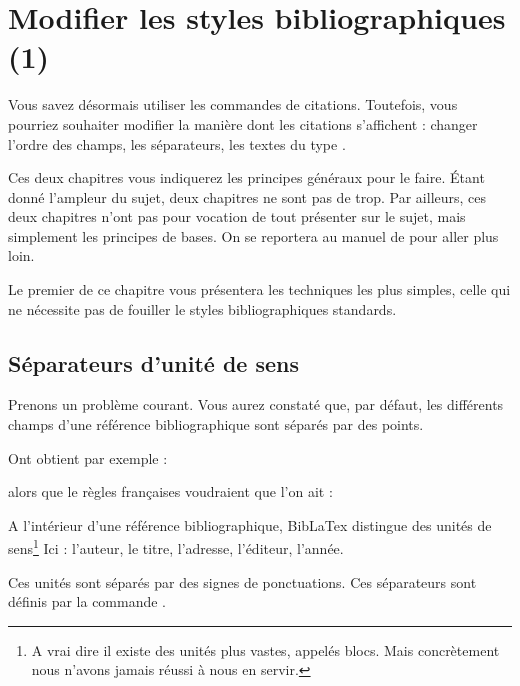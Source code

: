 \chapter{Modifier les styles bibliographiques (1)}

	\begin{prealable}
	
	Vous savez désormais utiliser les commandes de citations. Toutefois, vous pourriez souhaiter modifier la manière dont les citations s'affichent :  changer l'ordre des champs, les séparateurs, les textes du type .
	
	Ces deux chapitres vous indiquerez les principes généraux pour le faire. Étant donné l'ampleur du sujet, deux chapitres ne sont pas de trop. Par ailleurs, ces deux chapitres n'ont pas pour vocation de tout présenter sur le sujet, mais simplement les principes de bases. On se reportera au manuel de  pour aller plus loin.
	
	Le premier de ce chapitre vous présentera les techniques les plus simples, celle qui ne nécessite pas de fouiller le styles bibliographiques standards. 
	
	
	\end{prealable}
	
	
	\section{Séparateurs d'unité de sens}
	
Prenons un problème courant. Vous aurez constaté que, par défaut, les différents champs d'une référence bibliographique sont séparés par des points.

	Ont obtient par exemple :
	\begin{quotation}
	\cite{Marrou}
	\end{quotation}
	
	alors que le règles françaises voudraient que l'on ait :
	
	\begin{quotation}
	\cite{Marrou}
	\end{quotation}
	
A l'intérieur d'une référence bibliographique, BibLaTex distingue des unités de sens\footnote{A vrai dire il existe des unités plus vastes, appelés blocs. Mais concrètement nous n'avons jamais réussi à nous en servir.} Ici : l'auteur, le titre, l'adresse, l'éditeur, l'année. 

	Ces unités sont séparés par des signes de ponctuations. Ces séparateurs sont définis par la commande .
	
